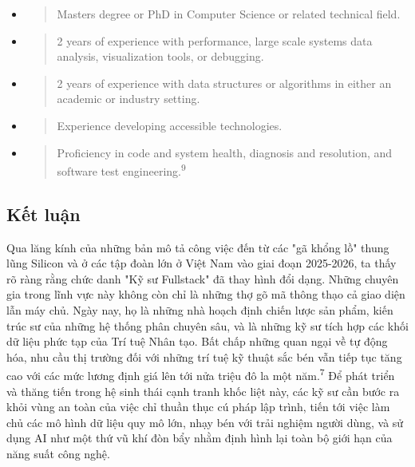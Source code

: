 \documentclass[12pt,a4paper]{article}
\begin{document}
\begin{itemize}
\item
  \begin{quote}
  Master\textquotesingle s degree or PhD in Computer Science or related technical field.
  \end{quote}
\item
  \begin{quote}
  2 years of experience with performance, large scale systems data analysis, visualization tools, or debugging.
  \end{quote}
\item
  \begin{quote}
  2 years of experience with data structures or algorithms in either an academic or industry setting.
  \end{quote}
\item
  \begin{quote}
  Experience developing accessible technologies.
  \end{quote}
\item
  \begin{quote}
  Proficiency in code and system health, diagnosis and resolution, and software test engineering.\textsuperscript{9}
  \end{quote}
\end{itemize}

\subsection{Kết luận}
Qua lăng kính của những bản mô tả công việc đến từ các "gã khổng lồ" thung lũng Silicon và ở các tập đoàn lớn ở Việt Nam vào giai đoạn 2025-2026, ta thấy rõ ràng rằng chức danh "Kỹ sư Fullstack" đã thay hình đổi dạng. Những chuyên gia trong lĩnh vực này không còn chỉ là những thợ gõ mã thông thạo cả giao diện lẫn máy chủ. Ngày nay, họ là những nhà hoạch định chiến lược sản phẩm, kiến trúc sư của những hệ thống phân chuyên sâu, và là những kỹ sư tích hợp các khối dữ liệu phức tạp của Trí tuệ Nhân tạo. Bất chấp những quan ngại về tự động hóa, nhu cầu thị trường đối với những trí tuệ kỹ thuật sắc bén vẫn tiếp tục tăng cao với các mức lương định giá lên tới nửa triệu đô la một năm.\textsuperscript{7} Để phát triển và thăng tiến trong hệ sinh thái cạnh tranh khốc liệt này, các kỹ sư cần bước ra khỏi vùng an toàn của việc chỉ thuần thục cú pháp lập trình, tiến tới việc làm chủ các mô hình dữ liệu quy mô lớn, nhạy bén với trải nghiệm người dùng, và sử dụng AI như một thứ vũ khí đòn bẩy nhằm định hình lại toàn bộ giới hạn của năng suất công nghệ.
\end{document}
